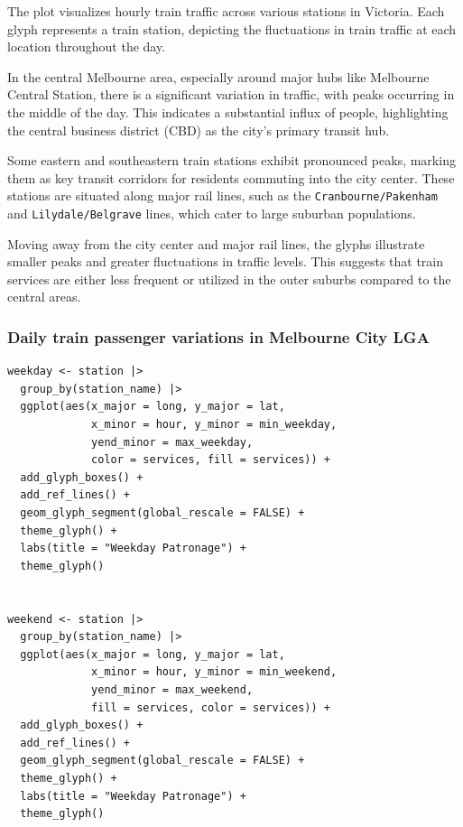 The plot visualizes hourly train traffic across various stations in Victoria. Each glyph represents a train station, depicting the fluctuations in train traffic at each location throughout the day.

In the central Melbourne area, especially around major hubs like Melbourne Central Station, there is a significant variation in traffic, with peaks occurring in the middle of the day. This indicates a substantial influx of people, highlighting the central business district (CBD) as the city's primary transit hub.

Some eastern and southeastern train stations exhibit pronounced peaks, marking them as key transit corridors for residents commuting into the city center. These stations are situated along major rail lines, such as the \texttt{Cranbourne/Pakenham} and \texttt{Lilydale/Belgrave} lines, which cater to large suburban populations.

Moving away from the city center and major rail lines, the glyphs illustrate smaller peaks and greater fluctuations in traffic levels. This suggests that train services are either less frequent or utilized in the outer suburbs compared to the central areas.

\hypertarget{daily-train-passenger-variations-in-melbourne-city-lga}{%
\subsubsection{Daily train passenger variations in Melbourne City LGA}\label{daily-train-passenger-variations-in-melbourne-city-lga}}

\begin{verbatim}
weekday <- station |>
  group_by(station_name) |>
  ggplot(aes(x_major = long, y_major = lat,
             x_minor = hour, y_minor = min_weekday,
             yend_minor = max_weekday,
             color = services, fill = services)) +
  add_glyph_boxes() +
  add_ref_lines() +
  geom_glyph_segment(global_rescale = FALSE) +
  theme_glyph() +
  labs(title = "Weekday Patronage") +
  theme_glyph() 


weekend <- station |>
  group_by(station_name) |>
  ggplot(aes(x_major = long, y_major = lat,
             x_minor = hour, y_minor = min_weekend,
             yend_minor = max_weekend,
             fill = services, color = services)) +
  add_glyph_boxes() +
  add_ref_lines() +
  geom_glyph_segment(global_rescale = FALSE) +
  theme_glyph() +
  labs(title = "Weekday Patronage") +
  theme_glyph() 
\end{verbatim}

